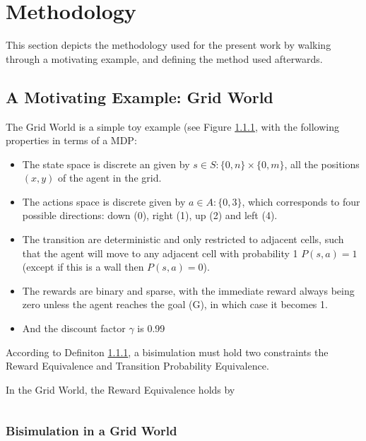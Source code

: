 
\chapter{Methodology}

This section depicts the methodology used for the present work by walking through a motivating example, and defining the method used afterwards.


\section{A Motivating Example: Grid World}

The Grid World is a simple toy example (see Figure \ref{}, with the following properties in terms of a MDP:

\begin{itemize}
    \item The state space is discrete an given by $ s \in S : \{0,n\} \times \{0,m\}$, all the positions $(x,y)$ of the agent in the grid.
    \item The actions space is discrete given by $a \in A: \{0,3\}$, which corresponds to four possible directions: down (0), right (1), up (2) and left (4).
    \item The transition are deterministic and only restricted to adjacent cells, such that the agent will move to any adjacent cell with probability 1 $P(s,a) = 1$ (except if this is a wall then $P(s,a) = 0$).
    \item The rewards are binary and sparse, with the immediate reward always being zero unless the agent reaches the goal (G), in which case it becomes 1.
    \item And the discount factor $\gamma$ is 0.99
\end{itemize}

According to Definiton \ref{}, a bisimulation must hold two constraints the Reward Equivalence and Transition Probability Equivalence. 



In the Grid World, the Reward Equivalence holds by

$$$$


\subsection{Bisimulation in a Grid World}

